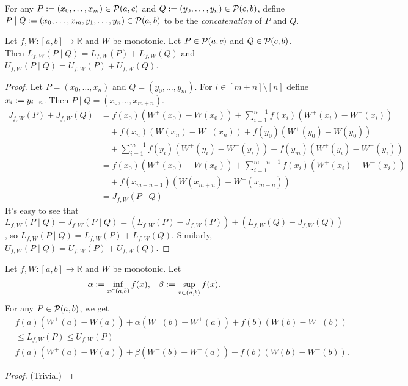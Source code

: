 \documentclass[a4paper,12pt,fleqn]{article}
\begin{document}
\begin{definition}[concatenation]
\label{defn:concat}
For any $P := (x_0, \ldots, x_m) \in \mathcal{P}(a, c)$
and $Q := (y_0, \ldots, y_n) \in \mathcal{P}(c, b)$,
define $P \mid Q := (x_0, \ldots, x_m, y_1, \ldots, y_n) \in \mathcal{P}(a, b)$
to be the \emph{concatenation} of $P$ and $Q$.
\end{definition}

\begin{lemma}
\label{thm:dsum:concat}
Let $f, W: [a, b] \to \mathbb{R}$ and $W$ be monotonic.
Let $P \in \mathcal{P}(a, c)$ and $Q \in \mathcal{P}(c, b)$.
Then $L_{f,W}(P \mid Q) = L_{f,W}(P) + L_{f,W}(Q)$
and $U_{f,W}(P \mid Q) = U_{f,W}(P) + U_{f,W}(Q)$.
\end{lemma}
\begin{proof}
Let $P = (x_0, \ldots, x_n)$ and $Q = (y_0, \ldots, y_m)$.
For $i \in [m+n] \setminus [n]$ define $x_i := y_{i-n}$.
Then $P \mid Q = (x_0, \ldots, x_{m+n})$.
\begin{align*}
J_{f,W}(P) + J_{f,W}(Q) &= f(x_0)(W^+(x_0) - W(x_0)) + \sum_{i=1}^{n-1} f(x_i)(W^+(x_i) - W^-(x_i))
    \\ &\quad + f(x_n)(W(x_n) - W^-(x_n)) + f(y_0)(W^+(y_0) - W(y_0))
    \\ &\quad + \sum_{i=1}^{m-1} f(y_i)(W^+(y_i) - W^-(y_i)) + f(y_m)(W^+(y_i) - W^-(y_i))
\\ &= f(x_0)(W^+(x_0) - W(x_0)) + \sum_{i=1}^{m+n-1} f(x_i)(W^+(x_i) - W^-(x_i))
    \\ &\quad + f(x_{m+n-1})(W(x_{m+n}) - W^-(x_{m+n}))
\\ &= J_{f,W}(P \mid Q)
\end{align*}
It's easy to see that
$L_{f,W}(P \mid Q) - J_{f,W}(P \mid Q)
    = (L_{f,W}(P) - J_{f,W}(P)) + (L_{f,W}(Q) - J_{f,W}(Q))$,
so $L_{f,W}(P \mid Q) = L_{f,W}(P) + L_{f,W}(Q)$.
Similarly, $U_{f,W}(P \mid Q) = U_{f,W}(P) + U_{f,W}(Q)$.
\end{proof}

\begin{lemma}
\label{thm:dsum:bounds}
Let $f, W: [a, b] \to \mathbb{R}$ and $W$ be monotonic. Let
\begin{align*}
\alpha &:= \inf_{x \in (a, b)} f(x),
& \beta &:= \sup_{x \in (a, b)} f(x).
\end{align*}
For any $P \in \mathcal{P}(a, b)$, we get
\begin{align*}
& f(a)(W^+(a)-W(a)) + \alpha(W^-(b) - W^+(a)) + f(b)(W(b) - W^-(b))
\\ &\le L_{f,W}(P) \le U_{f,W}(P)
\\ & f(a)(W^+(a)-W(a)) + \beta(W^-(b) - W^+(a)) + f(b)(W(b) - W^-(b)).
\end{align*}
\end{lemma}
\begin{proof}
(Trivial)
\end{proof}
\end{document}

